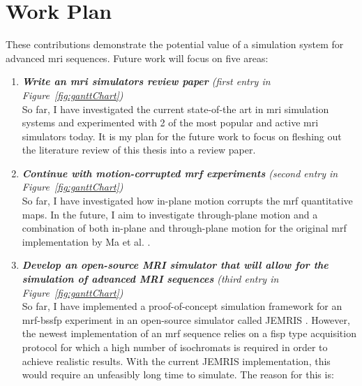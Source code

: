 \section{Work Plan}\label{chapterlabel4sec2}

These contributions demonstrate the potential value of a simulation system for advanced \ac{mri} sequences. 
Future work will focus on five areas:


\begin{enumerate}
    \item \textit{\textbf{Write an \ac{mri} simulators review paper} (first entry in Figure~\ref{fig:ganttChart})} \\
    So far, I have investigated the current state-of-the art in \ac{mri} simulation systems and experimented with 2 of the most popular and active \ac{mri} simulators today.
    It is my plan for the future work to focus on fleshing out the literature review of this thesis into a review paper.
    
	\item \textit{\textbf{Continue with motion-corrupted \ac{mrf} experiments} (second entry in Figure~\ref{fig:ganttChart})} \\
	So far, I have investigated how in-plane motion corrupts the \ac{mrf} quantitative maps.
	In the future, I aim to investigate through-plane motion and a combination of both in-plane and through-plane motion for the original \ac{mrf} implementation by Ma et al. \cite{Ma2013}.
	
	\item \textit{\textbf{Develop an open-source MRI simulator that will allow for the simulation of advanced MRI sequences} (third entry in Figure~\ref{fig:ganttChart})} \\
	
	So far, I have implemented a proof-of-concept simulation framework for an \ac{mrf}-\ac{bssfp} experiment in an open-source simulator called JEMRIS \cite{Stocker2010}.
	However, the newest implementation of an \ac{mrf} sequence relies on a \ac{fisp} type acquisition protocol for which a high number of isochromats is required in order to achieve realistic results.
	With the current JEMRIS implementation, this would require an unfeasibly long time to simulate.
	The reason for this is:
	

\end{enumerate}
